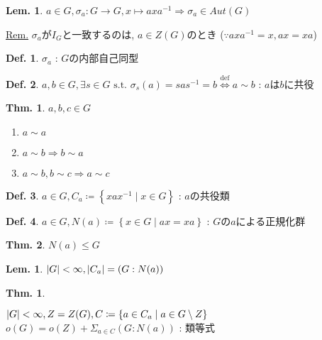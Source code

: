 \documentclass[uplatex,dvipdfmx,9pt]{beamer}
\newcommand{\defarrow}{\overset{\mathrm{def}}{\Leftrightarrow}}
\newcommand{\inverse}[1]{#1^{-1}}
\newcommand{\st}{\text{ s.t. }}
\newcommand{\lt}{\ensuremath <}
\newcounter{textThmCount}
\newcounter{textLemCount}
\theoremstyle{definition} %
\newtheorem{defn}{Def.}[subsection] %
\newtheorem{thm}{Thm.}[subsection] %
\newtheorem{thmText}[textThmCount]{Thm.}
\newtheorem{lemText}[textLemCount]{Lem.} %
\theoremstyle{example}
\begin{document}
      \begin{frame}
        
        \begin{lemText}
          $a \in G, \sigma_a \colon G \to G, x \mapsto ax\inverse{a} \Rightarrow \sigma_a \in Aut(G)$
        \end{lemText}
        \underline{Rem.} $\sigma_a$が$I_G$と一致するのは, $a \in Z(G)$のとき ($\because ax\inverse{a} = x, ax = xa$) \\

        \begin{defn}
          $\sigma_a$ : $G$の\alert{内部自己同型}
        \end{defn}

        \begin{defn}
          $a,b \in G, \exists s \in G \st \sigma_s(a) = sa\inverse{s} = b \defarrow a \sim b$ : $a$は$b$に\alert{共役}
        \end{defn}

        \begin{thm}
          $a, b, c \in G$
          \begin{enumerate}
            \item $a \sim a$
            \item $a \sim b \Rightarrow b \sim a$
            \item $a \sim b, b \sim c \Rightarrow a \sim c$
          \end{enumerate}
        \end{thm}

      \end{frame}

      \begin{frame}

        \begin{defn}
          $a \in G, C_a \coloneqq \left\{ xa\inverse{x} \mid x \in G \right\}$ : $a$の\alert{共役類}
        \end{defn}

        \begin{defn}
          $a \in G, N(a) \coloneqq \left\{ x \in G \mid ax = xa \right\}$ : $G$の$a$による\alert{正規化群}
        \end{defn}

        \begin{thm}
          $N(a) \le G$
        \end{thm}

        \begin{lemText}
          $|G| \lt \infty, |C_a| = (G : N(a))$
        \end{lemText}

        \begin{thmText}
          \hypertarget{thmText7-9}{}
          $|G| \lt \infty, Z = Z(G), C \coloneqq \left\{ a \in C_a \mid  a \in G \setminus Z \right\}$ \\
          $o(G) = o(Z) + \Sigma_{a \in C} (G : N(a))$ : \alert{類等式}
        \end{thmText}
        
      \end{frame}
\end{document}
